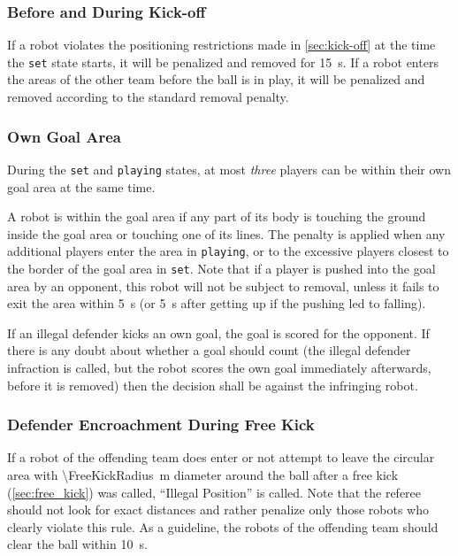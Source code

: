 \subsubsection{Before and During Kick-off}
\label{sec:ip_kick_off}
If a robot violates the positioning restrictions made in \cref{sec:kick-off} at the time the \texttt{set} state starts, it will be penalized and removed for \qty{15}{\second}.
If a robot enters the areas of the other team before the ball is in play, it will be penalized and removed according to the standard removal penalty.

\subsubsection{Own Goal Area}
\label{sec:ip_own_goal_area}

During the \texttt{set} and \texttt{playing} states, at most \textit{three} players can be within their own goal area at the same time.

A robot is within the goal area if any part of its body is touching the ground inside the goal area or touching one of its lines. The penalty is applied when any additional players enter the area in \texttt{playing}, or to the excessive players closest to the border of the goal area in \texttt{set}. Note that if a player is pushed into the goal area by an opponent, this robot will not be subject to removal, unless it fails to exit the area within \qty{5}{\second} (or \qty{5}{\second} after getting up if the pushing led to falling).

If an illegal defender kicks an own goal, the goal is scored for the opponent. If there is any doubt about whether a goal should count (\eg the illegal defender infraction is called, but the robot scores the own goal immediately afterwards, before it is removed) then the decision shall be against the infringing robot.

\subsubsection{Defender Encroachment During Free Kick}
\label{sec:ip_free_kick}

If a robot of the offending team does enter or not attempt to leave the circular area with \qty{\FreeKickRadius}{\metre} diameter around the ball after a free kick (\cf \cref{sec:free_kick}) was called, ``Illegal Position'' is called. Note that the referee should not look for exact distances and rather penalize only those robots who clearly violate this rule. As a guideline, the robots of the offending team should clear the ball within \qty{10}{\second}.

